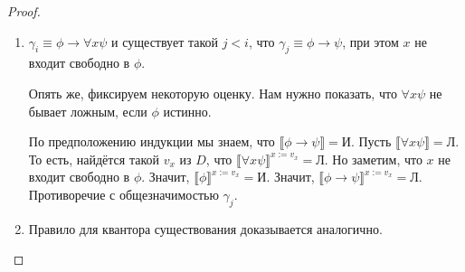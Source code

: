 \begin{proof}
\begin{enumerate}
\item $\gamma_i \equiv \phi \rightarrow \forall{x}\psi$ и существует такой $j < i$, что
$\gamma_j \equiv \phi \rightarrow \psi$, при этом $x$ не входит свободно в $\phi$.

Опять же, фиксируем некоторую оценку.
Нам нужно показать, что $\forall{x}\psi$ не бывает ложным, если $\phi$ истинно.

По предположению индукции мы знаем, что $\llbracket \phi \rightarrow \psi \rrbracket = \texttt{И}$.
Пусть $\llbracket\forall{x}\psi\rrbracket = \texttt{Л}$. То есть, найдётся такой $v_x$ из $D$, что
$\llbracket\forall{x}\psi\rrbracket^{x:=v_x} = \texttt{Л}$. 
Но заметим, что $x$ не входит свободно в $\phi$. Значит, $\llbracket \phi \rrbracket^{x:=v_x} = \texttt{И}$.
Значит, $\llbracket\phi \rightarrow \psi\rrbracket^{x:=v_x} = \texttt{Л}$. Противоречие с общезначимостью $\gamma_j$.

\item Правило для квантора существования доказывается аналогично.

\end{enumerate}

\end{proof}
